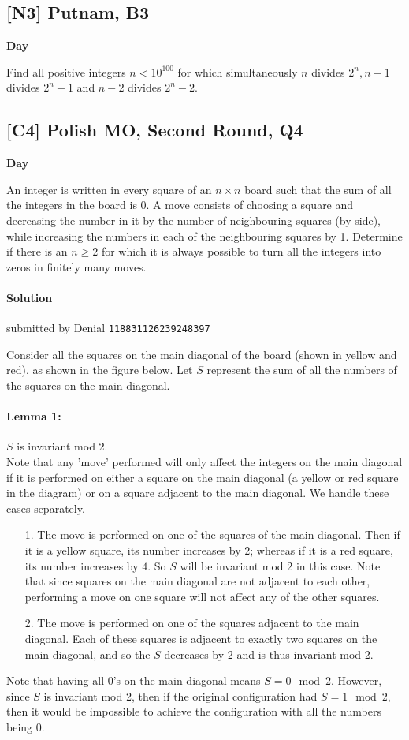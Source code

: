 \documentclass[10pt]{article}
\newcommand{\themonth}{March}
\newcommand{\theyear}{2019}
\newcounter{day}
\newcounter{solution}
\newcounter{datenumber}
\newcommand{\problem}[4][0]{
	\newpage
	\subsection{[#3] \space #2} \hfill 
	{\large\textbf{Day \arabic{day}}} %
	\begin{flushleft} #4 \end{flushleft}
	\vspace{1em}
	\addtocounter{day}{1}
	\addtocounter{datenumber}{1}
	\setcounter{solution}{1}
}
\newcommand{\solution}[4][0]{
	\paragraph{Solution \arabic{solution}} \hfill submitted by #2 \hfill \texttt{#3}
	\begin{flushleft} #4 \end{flushleft}
	\addtocounter{solution}{1}
	\vspace{1em}
}
\begin{document}
\problem[29]{2018 Putnam, B3}{N3}{Find all positive integers $n < 10^{100}$ for which simultaneously $n$ divides $2^n, n - 1$ divides $2^n - 1$ and $n - 2$ divides $2^n - 2$.}

\problem[30]{2008 Polish MO, Second Round, Q4}{C4}{An integer is written in every square of an $n \times n$ board such that the sum of all the integers in the board is 0. A move consists of choosing a square and decreasing the number in it by the number of neighbouring squares (by side), while increasing the numbers in each of the neighbouring squares by 1. Determine if there is an $n \geq 2$ for which it is always possible to turn all the integers into zeros in finitely many moves.}

\solution[30]{Denial}{118831126239248397}{
Consider all the squares on the main diagonal of the board (shown in yellow and red), as shown in the figure below. Let $S$ represent the sum of all the numbers of the squares on the main diagonal. \\ 

\paragraph{Lemma 1: }$S$ is invariant mod 2. \\
Note that any 'move' performed will only affect the integers on the main diagonal if it is performed on either a square on the main diagonal (a yellow or red square in the diagram) or on a square adjacent to the main diagonal. We handle these cases separately. 
\begin{enumerate}
	\item[1. ]The move is performed on one of the squares of the main diagonal. Then if it is a yellow square, its number increases by $2$; whereas if it is a red square, its number increases by $4$. So $S$ will be invariant mod 2 in this case. Note that since squares on the main diagonal are not adjacent to each other, performing a move on one square will not affect any of the other squares. 
	\item[2. ]The move is performed on one of the squares adjacent to the main diagonal. Each of these squares is adjacent to exactly two squares on the main diagonal, and so the $S$ decreases by 2 and is thus invariant mod 2. 
\end{enumerate}
Note that having all 0's on the main diagonal means $S = 0 \mod 2$. However, since $S$ is invariant mod 2, then if the original configuration had $S = 1 \mod 2$, then it would be impossible to achieve the configuration with all the numbers being $0$. 
}
\end{document}
